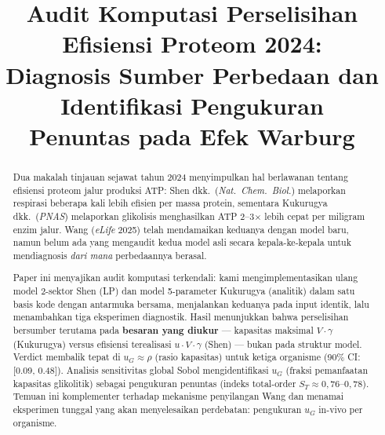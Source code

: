 \documentclass[conference]{IEEEtran}
\begin{document}
\title{Audit Komputasi Perselisihan Efisiensi Proteom 2024:\\
Diagnosis Sumber Perbedaan dan Identifikasi Pengukuran\\Penuntas pada Efek Warburg}

\author{
}

\maketitle

\begin{abstract}
Dua makalah tinjauan sejawat tahun 2024 menyimpulkan hal berlawanan
tentang efisiensi proteom jalur produksi ATP: Shen dkk.\ (\textit{Nat.\ Chem.\ Biol.})
melaporkan respirasi beberapa kali lebih efisien per massa protein,
sementara Kukurugya dkk.\ (\textit{PNAS}) melaporkan glikolisis menghasilkan
ATP 2--3$\times$ lebih cepat per miligram enzim jalur.
Wang (\textit{eLife} 2025) telah mendamaikan keduanya dengan model baru,
namun belum ada yang mengaudit kedua model asli secara kepala-ke-kepala
untuk mendiagnosis \textit{dari mana} perbedaannya berasal.

Paper ini menyajikan audit komputasi terkendali: kami mengimplementasikan
ulang model 2-sektor Shen (LP) dan model 5-parameter Kukurugya (analitik)
dalam satu basis kode dengan antarmuka bersama, menjalankan keduanya pada
input identik, lalu menambahkan tiga eksperimen diagnostik.
Hasil menunjukkan bahwa perselisihan bersumber terutama pada
\textbf{besaran yang diukur} --- kapasitas maksimal $V\!\cdot\!\gamma$
(Kukurugya) versus efisiensi terealisasi $u \cdot V\!\cdot\!\gamma$ (Shen)
--- bukan pada struktur model.
Verdict membalik tepat di $u_G \approx \rho$ (rasio kapasitas)
untuk ketiga organisme (90\% CI: [0.09, 0.48]).
Analisis sensitivitas global Sobol mengidentifikasi $u_G$ (fraksi
pemanfaatan kapasitas glikolitik) sebagai pengukuran penuntas
(indeks total-order $S_T \approx 0{,}76$--$0{,}78$).
Temuan ini komplementer terhadap mekanisme penyilangan Wang
dan menamai eksperimen tunggal yang akan menyelesaikan perdebatan:
pengukuran $u_G$ in-vivo per organisme.
\end{abstract}
\end{document}
